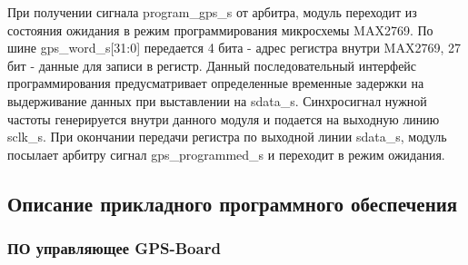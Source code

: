 При получении сигнала program\_gps\_s от арбитра, модуль переходит из состояния ожидания в режим программирования микросхемы
MAX2769. По шине gps\_word\_s[31:0] передается 4 бита - адрес регистра внутри MAX2769, 27 бит - данные для записи в регистр.
Данный последовательный интерфейс программирования предусматривает определенные временные задержки на выдерживание данных
при выставлении на sdata\_s. Синхросигнал нужной частоты генерируется внутри данного модуля и подается на выходную линию sclk\_s.
При окончании передачи регистра по выходной линии sdata\_s, модуль посылает арбитру сигнал gps\_programmed\_s и переходит в режим
ожидания.

\subsection{Описание прикладного программного обеспечения}
\subsubsection{ПО управляющее GPS-Board}
\label{sec:board_daemon}

\newpage
